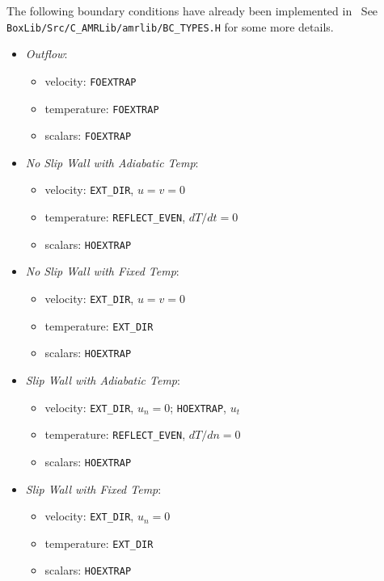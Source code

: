The following boundary conditions have already been implemented in
\castro\ See {\tt BoxLib/Src/C\_AMRLib/amrlib/BC\_TYPES.H} for some
more details.
\begin{itemize}
\item {\it Outflow}:
  \begin{itemize}
    \item velocity: {\tt FOEXTRAP}
    \item temperature: {\tt FOEXTRAP}
    \item scalars: {\tt FOEXTRAP}
  \end{itemize}

\item {\it No Slip Wall with Adiabatic Temp}:
  \begin{itemize}
  \item velocity: {\tt EXT\_DIR}, $u=v=0$
  \item temperature: {\tt REFLECT\_EVEN}, $dT/dt=0$
  \item scalars: {\tt HOEXTRAP}
  \end{itemize}

\item {\it No Slip Wall with Fixed Temp}:
  \begin{itemize}
  \item velocity: {\tt EXT\_DIR}, $u=v=0$
  \item temperature: {\tt EXT\_DIR}
  \item scalars: {\tt HOEXTRAP}
  \end{itemize}

\item {\it Slip Wall with Adiabatic Temp}:
  \begin{itemize}
  \item velocity: {\tt EXT\_DIR}, $u_n=0$; {\tt HOEXTRAP}, $u_t$
  \item temperature: {\tt REFLECT\_EVEN}, $dT/dn=0$
  \item scalars: {\tt HOEXTRAP}
  \end{itemize}

\item {\it Slip Wall with Fixed Temp}:
  \begin{itemize}
  \item velocity: {\tt EXT\_DIR}, $u_n=0$
  \item temperature: {\tt EXT\_DIR}
  \item scalars: {\tt HOEXTRAP}
  \end{itemize}

\end{itemize}

